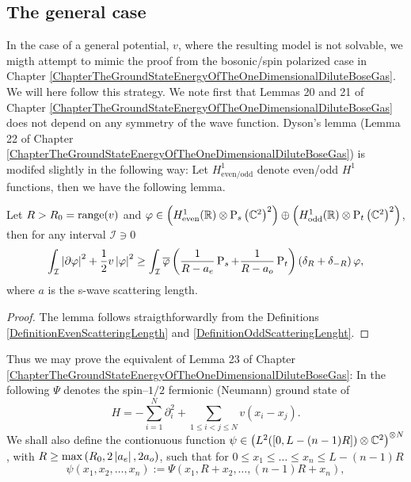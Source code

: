\subsection{The general case}
In the case of a general potential, $ v $, where the resulting model is not solvable, we migth attempt to mimic the proof from the bosonic/spin polarized case in Chapter \ref{ChapterTheGroundStateEnergyOfTheOneDimensionalDiluteBoseGas}. We will here follow this strategy. We note first that Lemmas 20 and 21 of Chapter \ref{ChapterTheGroundStateEnergyOfTheOneDimensionalDiluteBoseGas} does not depend on any symmetry of the wave function. Dyson's lemma (Lemma 22 of Chapter \ref{ChapterTheGroundStateEnergyOfTheOneDimensionalDiluteBoseGas}) is modifed slightly in the following way: Let $ H^1_{\text{even/odd}} $ denote even/odd $ H^1 $ functions, then we have the following lemma.
\begin{lemma}
	\label{LemmaDysonSpin1/2Fermi}
	Let $ R>R_0=\textnormal{range}(v) $ and $ \varphi\in \left(H_{\textnormal{even}}^1(\mathbb{R})\otimes\operatorname{P}_s \left(\mathbb{C}^2\right)^2\right)\oplus\left(H_{\textnormal{odd}}^1(\mathbb{R})\otimes \operatorname{P}_t \left(\mathbb{C}^2\right)^2 \right) $, then for any interval $ \mathcal{I}\ni 0 $ 
	\begin{equation}
	\int_{\mathcal{I}} \left\lvert \partial \varphi \right\rvert^2+\frac12 v\left\lvert \varphi \right\rvert^2\geq \int_{\mathcal{I}}\overline{\varphi}\left(\frac{1}{R-a_e}\operatorname{P}_s+\frac{1}{R-a_o}\operatorname{P}_t\right)\left(\delta_R+\delta_{-R}\right)\varphi,
	\end{equation}
	where $ a $ is the s-wave scattering length.
\end{lemma}
\begin{proof}
	The lemma follows straigthforwardly from the Definitions \ref{DefinitionEvenScatteringLength} and \ref{DefinitionOddScatteringLenght}.
\end{proof}
Thus we may prove the equivalent of Lemma 23 of Chapter \ref{ChapterTheGroundStateEnergyOfTheOneDimensionalDiluteBoseGas}: In the following $ \Psi $ denotes the spin--$ 1/2 $ fermionic (Neumann) ground state of \begin{equation}
H=-\sum_{i=1}^{N}\partial_i^2+\sum_{1\leq i<j\leq N}v(x_i-x_j).
\end{equation}	
We shall also define the contionuous function $ \psi\in \left(L^2([0,L-(n-1)R])\otimes\mathbb{C}^2\right)^{\otimes N} $, with $ R\geq \max\left(R_0,2\left\lvert a_e \right\rvert,2a_o\right)  $, such that for $ 0\leq x_1\leq\dots\leq x_n\leq L-(n-1)R $
\begin{equation}
\label{Definition:psi}
\psi(x_1,x_2,\dots,x_n):=\Psi(x_1,R+x_2,\dots,(n-1)R+x_n), 
\end{equation}
